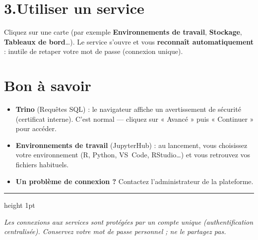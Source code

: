 \documentclass[11pt,a4paper]{article}
\newcommand{\service}[1]{\textbf{\color{anstatvertfonce}#1}}
\begin{document}
\section*{3.\quad Utiliser un service}
Cliquez sur une carte (par exemple \service{Environnements de travail},
\service{Stockage}, \service{Tableaux de bord}\dots). Le service s'ouvre et vous
\textbf{reconnaît automatiquement} : inutile de retaper votre mot de passe
(connexion unique).

\section*{Bon à savoir}
\begin{itemize}
  \item \service{Trino} (Requêtes SQL) : le navigateur affiche un avertissement de
        sécurité (certificat interne). C'est normal — cliquez sur « Avancé » puis
        « Continuer » pour accéder.
  \item \service{Environnements de travail} (JupyterHub) : au lancement, vous
        choisissez votre environnement (R, Python, VS~Code, RStudio\dots) et vous
        retrouvez vos fichiers habituels.
  \item \textbf{Un problème de connexion ?} Contactez l'administrateur de la plateforme.
\end{itemize}

\vspace{6pt}
{\color{anstatorange}\hrule height 1pt}
\vspace{4pt}
{\small\color{anstatgris}\itshape
Les connexions aux services sont protégées par un compte unique (authentification
centralisée). Conservez votre mot de passe personnel ; ne le partagez pas.}
\end{document}
